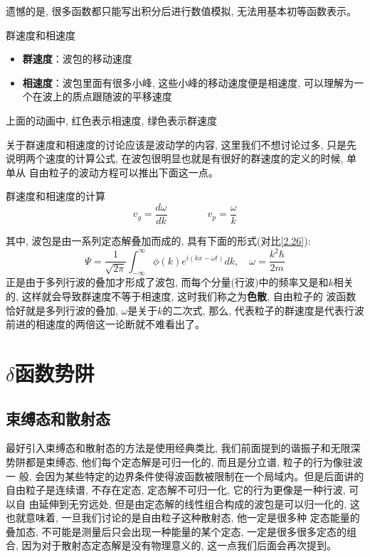 \documentclass[a4paper,zihao=-4,linespread=1]{ctexrep}
\newenvironment{lequation}{\large\begin{equation}}{\end{equation}}
\begin{document}
    遗憾的是, 很多函数都只能写出积分后进行数值模拟, 无法用基本初等函数表示。
    \begin{define}{群速度和相速度}
        \begin{itemize}
            \item \textbf{群速度}：波包的移动速度
            \item \textbf{相速度}：波包里面有很多小峰, 这些小峰的移动速度便是相速度, 可以理解为一个在波上的质点跟随波的平移速度
        \end{itemize}
    \end{define}
    \begin{center}
        上面的动画中, {\color{red}红色}表示相速度, {\color{green}绿色}表示群速度
    \end{center}
    
    关于群速度和相速度的讨论应该是波动学的内容, 这里我们不想讨论过多, 只是先说明两个速度的计算公式, 在波包很明显也就是有很好的群速度的定义的时候, 单单从
    自由粒子的波动方程可以推出下面这一点。
    \begin{theorem}{群速度和相速度的计算}
        \begin{lequation}
            \boxed{
               v_g=\frac{d\omega}{dk}\qquad\qquad v_p=\frac{\omega}{k} 
            }
        \end{lequation}
    \end{theorem}
    其中, 波包是由一系列定态解叠加而成的, 具有下面的形式(对比\ref{2.26}):
    $$\Psi=\frac{1}{\sqrt{2\pi}}\int_{-\infty}^{\infty}\phi(k)e^{i\left(kx-\omega t\right)}dk,\quad \omega=\frac{k^2\hbar}{2m}$$
    正是由于多列行波的叠加才形成了波包, 而每个分量(行波)中的频率又是和$k$相关的, 这样就会导致群速度不等于相速度, 这时我们称之为\textbf{色散}, 自由粒子的
    波函数恰好就是多列行波的叠加, $\omega$是关于$k$的二次式, 那么, 代表粒子的群速度是代表行波前进的相速度的两倍这一论断就不难看出了。
    \section{\texorpdfstring{$\delta$}.函数势阱}
    \subsection{束缚态和散射态}
    最好引入束缚态和散射态的方法是使用经典类比, 我们前面提到的谐振子和无限深势阱都是束缚态, 他们每个定态解是可归一化的, 而且是分立谱, 粒子的行为像驻波一
    般, 会因为某些特定的边界条件使得波函数被限制在一个局域内。但是后面讲的自由粒子是连续谱, 不存在定态, 定态解不可归一化, 它的行为更像是一种行波, 可以自
    由延伸到无穷远处, 但是由定态解的线性组合构成的波包是可以归一化的, 这也就意味着, 一旦我们讨论的是自由粒子这种散射态, 他一定是很多种
    定态能量的叠加态, 不可能是测量后只会出现一种能量的某个定态, 一定是很多很多定态的组合, 因为对于散射态定态解是没有物理意义的, 这一点我们后面会再次提到。
\end{document}
